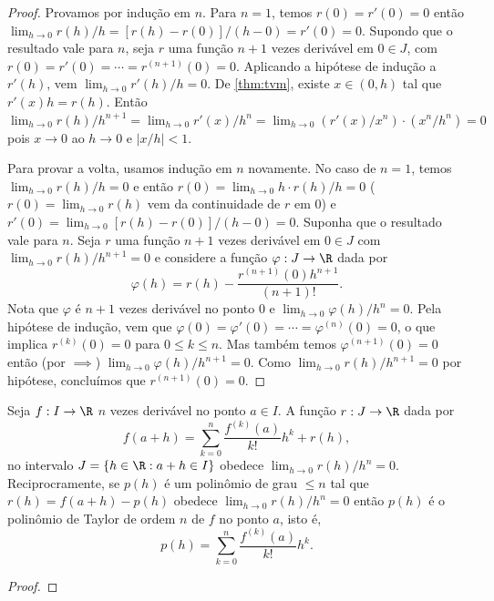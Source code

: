 \documentclass{article}
\begin{document}
\begin{proof}
    Provamos por indução em \(n\). Para \(n=1\), temos \(r(0)=r'(0)=0\) então \(\lim_{h\to 0} r(h)/h = [r(h)-r(0)]/(h-0) = r'(0) = 0\). Supondo que o resultado vale para \(n\), seja \(r\) uma função \(n+1\) vezes derivável em \(0 \in J\), com \(r(0)=r'(0)=\cdots=r^{(n+1)}(0)=0\). Aplicando a hipótese de indução a \(r'(h)\), vem \(\lim_{h\to 0} r'(h)/h=0\). De \eqref{thm:tvm}, existe \(x \in (0,h)\) tal que \(r'(x)h = r(h)\). Então \(\lim_{h \to 0} r(h)/h^{n+1} = \lim_{h \to 0} r'(x)/h^n = \lim_{h \to 0} (r'(x)/x^n) \cdot (x^n/h^n) = 0\) pois \(x \to 0\) ao \(h \to 0\) e \(\vert x/h \vert <1\).
    
    Para provar a volta, usamos indução em \(n\) novamente. No caso de \(n=1\), temos \(\lim_{h\to 0} r(h)/h = 0\) e então \(r(0) = \lim_{h\to 0} h \cdot r(h)/h = 0\) (\(r(0) = \lim_{h \to 0} r(h)\) vem da continuidade de \(r\) em \(0\)) e \(r'(0) = \lim_{h\to 0} [r(h)-r(0)]/(h-0) = 0\). Suponha que o resultado vale para \(n\). Seja \(r\) uma função \(n+1\) vezes derivável em \(0 \in J\) com \(\lim_{h\to 0} r(h)/h^{n+1}=0\) e considere a função \(\varphi: J \to \R\) dada por
    \[
        \varphi(h) = r(h) - \frac{r^{(n+1)}(0)h^{n+1}}{(n+1)!}.
    \]
    Nota que \(\varphi\) é \(n+1\) vezes derivável no ponto \(0\) e \(\lim_{h\to 0} \varphi(h)/h^n = 0\). Pela hipótese de indução, vem que \(\varphi(0) = \varphi'(0) = \cdots = \varphi^{(n)}(0) = 0\), o que implica \(r^{(k)}(0) = 0\) para \(0 \leq k \leq n\). Mas também temos \(\varphi^{(n+1)}(0)= 0\) então (por \(\implies\)) \(\lim_{h\to 0} \varphi(h)/h^{n+1} = 0\). Como \(\lim_{h\to 0} r(h)/h^{n+1} = 0\) por hipótese, concluímos que \(r^{(n+1)}(0)=0\). 
\end{proof}

\begin{thm} 
    Seja \(f: I \to \R\) \(n\) vezes derivável no ponto \(a \in I\). A função \(r: J \to \R\) dada por \[f(a+h) = \sum_{k=0}^{n} \frac{f^{(k)}(a)}{k!} h^k + r(h),\] no intervalo \(J = \{h \in \R : a+h \in I\}\) obedece \(\lim_{h \to 0} r(h)/h^n = 0\). Reciprocramente, se \(p(h)\) é um polinômio de grau \(\leq n\) tal que \(r(h) = f(a+h) - p(h)\) obedece \(\lim_{h \to 0} r(h)/h^n = 0\) então \(p(h)\) é o polinômio de Taylor de ordem \(n\) de \(f\) no ponto \(a\), isto é, \[p(h) = \sum_{k=0}^{n} \frac{f^{(k)}(a)}{k!} h^k.\]
\end{thm}

\begin{proof}
    
\end{proof}
\end{document}
